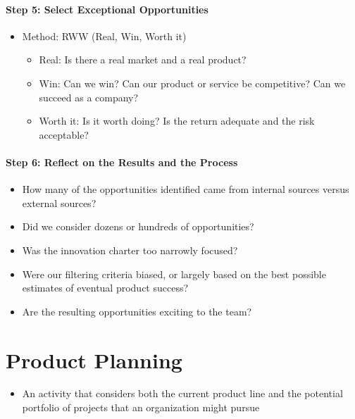 \documentclass[a4paper,12pt,openany]{book}
\begin{document}
\subsubsection{Step 5: Select Exceptional Opportunities}
\begin{itemize}
    \item Method: RWW (Real, Win, Worth it)
    \begin{itemize}
        \item Real: Is there a real market and a real product?
        \item Win: Can we win? Can our product or service be competitive? Can we succeed as a company?
        \item Worth it: Is it worth doing? Is the return adequate and the risk acceptable?
    \end{itemize}
\end{itemize}

\subsubsection{Step 6: Reflect on the Results and the Process}
\begin{itemize}
    \item How many of the opportunities identified came from internal sources versus external sources?
    \item Did we consider dozens or hundreds of opportunities?
    \item Was the innovation charter too narrowly focused?
    \item Were our filtering criteria biased, or largely based on the best possible estimates of eventual product success?
    \item Are the resulting opportunities exciting to the team?
\end{itemize}

\chapter{Product Planning}
\begin{itemize}
    \item An activity that considers both the current product line and the potential portfolio of projects that an organization might pursue
\end{itemize}
\end{document}
